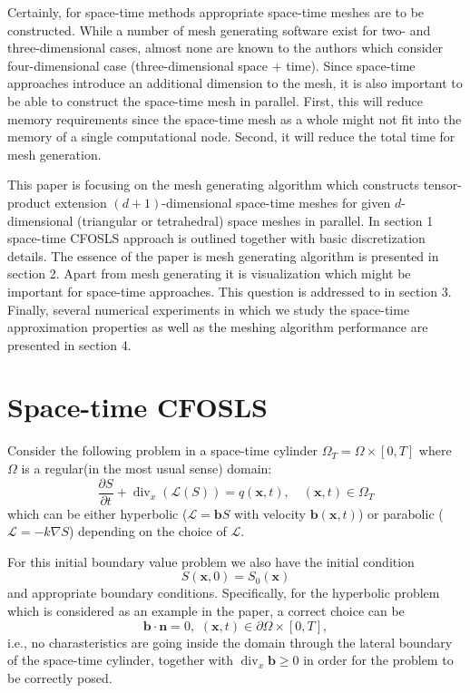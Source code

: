 \documentclass[12pt]{article}
\begin{document}
Certainly, for space-time methods appropriate space-time meshes are to be constructed. While a number of mesh generating software exist for two- and three-dimensional cases, almost none are known to the authors which consider four-dimensional case (three-dimensional space + time). Since space-time approaches introduce an additional dimension to the mesh, it is also important to be able to construct the space-time mesh in parallel. First, this will reduce memory requirements since the space-time mesh as a whole might not fit into the memory of a single computational node. Second, it will reduce the total time for mesh generation.

This paper is focusing on the mesh generating algorithm which constructs tensor-product extension $(d+1)$-dimensional space-time meshes for given $d$-dimensional  (triangular or tetrahedral) space meshes in parallel. In section 1 space-time CFOSLS approach is outlined together with basic discretization details. The essence of the paper is mesh generating algorithm is presented in section 2. Apart from mesh generating it is visualization which might be important for space-time approaches. This question is addressed to in section 3. Finally, several numerical experiments in which we study the space-time approximation properties as well as the meshing algorithm performance are presented in section 4.

\section{Space-time CFOSLS}
Consider the following problem in a space-time cylinder $\Omega_T = \Omega \times [0, T]$ where $
\Omega$ is a regular(in the most usual sense) domain:
$$
\frac{\partial S}{\partial t} + \operatorname{div}_x \left( \mathcal{L}(S) \right) = q(\mathbf{x}, t), \quad (\mathbf{x},t) \in \Omega_T
$$
which can be either hyperbolic ($\mathcal{L} = \mathbf{b} S$ with velocity $\mathbf{b}(\mathbf{x}, t)$) or parabolic ($\mathcal{L} = - k \nabla S$) depending on the choice of $\mathcal{L}$.

For this initial boundary value problem we also have the initial condition
$$
S(\mathbf{x},0) = S_0(\mathbf{x})
$$
and appropriate boundary conditions. Specifically, for the hyperbolic problem which is considered as an example in the paper, a correct choice can be
$$
\mathbf{b} \cdot \mathbf{n} = 0, \, \, (\mathbf{x},t) \in \partial \Omega \times [0,T],
$$
i.e., no charasteristics are going inside the domain through the lateral boundary of the space-time cylinder,
together with $\operatorname{div}_{x} \mathbf{b} \geq 0$ in order for the problem to be correctly posed.
\end{document}
